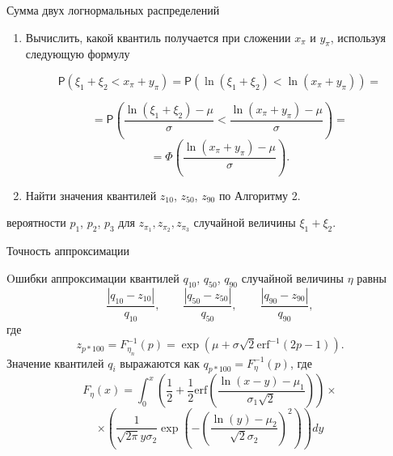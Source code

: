 \documentclass[ucs, notheorems, handout]{beamer}
\newenvironment{pr3}{\par\noindent{\bf Результат:}}{}
\begin{document}
\begin{frame}{Сумма двух логнормальных распределений }
	

	\begin{enumerate}
		\item Вычислить, какой квантиль получается при сложении $x_{\pi}$ и $y_{\pi}$, используя следующую формулу
		
		\begin{equation*}
			\mathsf{P}(\xi_{1}+\xi_{2}< x_{\pi}+y_{\pi}) = \mathsf{P}(\ln(\xi_{1}+\xi_{2})<\ln(x_{\pi}+y_{\pi}))=
		\end{equation*}
		
		
			\[=\mathsf{P}\left(\displaystyle{\frac{\ln(\xi_{1}+\xi_{2})-\mu}{\sigma}}<\displaystyle{\frac{\ln(x_{\pi}+y_{\pi})-\mu}{\sigma}}\right)=\]\[ =\Phi\left(\dfrac{\ln(x_{\pi}+y_{\pi})-\mu}{\sigma}\right).\]
		
		
		\item Найти значения квантилей $z_{10}$, $z_{50}$, $z_{90}$ по Алгоритму 2.
	\end{enumerate}
	\begin{pr3}\end{pr3} вероятности $p_{1}$, $p_{2}$, $p_{3}$ для $z_{\pi_{1}}, z_{\pi_{2}}, z_{\pi_{3}}$ случайной величины $\xi_{1} + \xi_{2}$.
	
	
\end{frame}

\begin{frame}{Точность аппроксимации }
	
	Oшибки аппроксимации квантилей $q_{10}$, $q_{50}$, $q_{90}$ случайной величины $\eta$ равны
\[\dfrac{\left| q_{10} - z_{10}\right|}{q_{10}}, \quad\quad \dfrac{\left| q_{50} - z_{50}\right|}{q_{50}}, \quad\quad \dfrac{\left| q_{90} - z_{90}\right|}{q_{90}},\] где
\[z_{p*100} = F_{\eta_{n}}^{-1}(p) = \exp(\mu+\sigma\sqrt{2}\mathrm{erf}^{-1}(2p-1)).\]
Значение квантилей $q_{i}$ выражаются как $q_{p*100} = F_{\eta}^{-1}(p)$, где
\[F_{\eta}(x) = \int_{0}^{x}\left( \dfrac{1}{2}+\dfrac{1}{2} \mathrm{erf}\left( \dfrac{\ln(x-y)-\mu_{1}}{\sigma_{1}\sqrt{2}}\right) \right)\times\]
\[\times \left( \dfrac{1}{\sqrt{2\pi}y\sigma_{2}}\exp\left( -\left( \dfrac{\ln(y)-\mu_{2}}{\sqrt{2}\sigma_{2}}\right) ^{2}\right) \right) dy \]
	
\end{frame}
\end{document}
